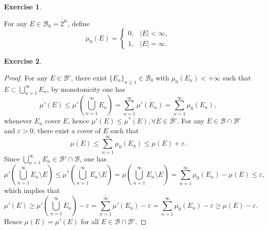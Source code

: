 \documentclass[a4paper]{article}
\newtheorem{ex}{Exercise}[subsection]
\begin{document}
\begin{ex}\end{ex} For any $E \in \mathcal{B}_0 = 2^\mathbb{N}$, define $$
\mu_0(E) = \begin{cases}
    0, &|E| < \infty,\\
    1, &|E| = \infty.
\end{cases}
$$

\begin{ex}\end{ex}\begin{proof}
For any $E \in \mathcal{B}'$, there exist $\{E_n\}_{n \geq 1} \in \mathcal{B}_0$ with $\mu_0(E_n) < +\infty$ such that
$E \subset \bigcup_{n = 1}^\infty E_n$, by monotonicity one has $$
\mu'(E) \leq \mu'(\bigcup_{n = 1}^\infty E_n) = \sum_{n = 1}^\infty \mu'(E_n) = \sum_{n = 1}^\infty \mu_0(E_n),
$$whenever $E_n$ cover $E$, hence $\mu'(E) \leq \mu^*(E), \forall E \in \mathcal{B}'$. For any $E \in \mathcal{B} \cap \mathcal{B}'$
and $\varepsilon > 0$, there exist a cover of $E$ such that $$
\mu(E) \leq \sum_{n = 1}^\infty \mu_0(E_n) \leq \mu(E) + \varepsilon.
$$Since $\bigcup_{n = 1}^\infty E_n \in \mathcal{B}' \cap \mathcal{B}$, one has $$
\mu'(\bigcup_{n = 1}^\infty E_n \setminus E) \leq \mu^*(\bigcup_{n = 1}^\infty E_n \setminus E) = 
\mu(\bigcup_{n = 1}^\infty E_n \setminus E) = \sum_{n = 1}^\infty \mu_0(E_n) - \mu(E)\leq \varepsilon,
$$which implies that $$
\mu'(E) \geq \mu'(\bigcup_{n = 1}^\infty E_n) - \varepsilon = \sum_{n = 1}^\infty \mu'(E_n) - \varepsilon
= \sum_{n = 1}^\infty \mu_0(E_n) - \varepsilon \geq \mu(E) - \varepsilon.
$$Hence $\mu(E) = \mu'(E)$ for all $E \in \mathcal{B} \cap \mathcal{B}'$.
\end{proof}
\end{document}
